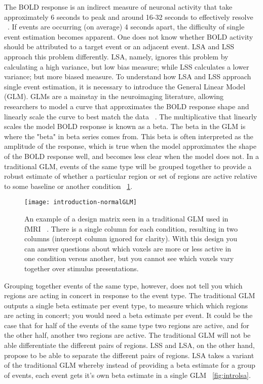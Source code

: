 \documentclass[10pt,letterpaper]{article}
\begin{document}
The BOLD response is an indirect measure of neuronal activity that take approximately 6 seconds to
peak and around 16-32 seconds to effectively resolve ~\cite{Glover1999}.
If events are occurring (on average) 4 seconds apart, the difficulty of single event estimation
becomes apparent.
One does not know whether BOLD activity should be attributed to a target event or an
adjacent event.
LSA and LSS approach this problem differently.
LSA, namely, ignores this problem by calculating a high variance, but low bias measure;
while LSS calculates a lower variance; but more biased measure.
To understand how LSA and LSS approach single event estimation, it is necessary to introduce
the General Linear Model (GLM).
GLMs are a mainstay in the neuroimaging literature, allowing researchers to model
a curve that approximates the BOLD response shape and linearly scale the curve
to best match the data ~\cite{Friston1995}.
The multiplicative that linearly scales the model BOLD response is known as a beta.
The beta in the GLM is where the "beta" in beta series comes from.
This beta is often interpreted as the amplitude of the response, which is true when the
model approximates the shape of the BOLD response well, and becomes less clear when
the model does not.
In a traditional GLM, events of the same type will be grouped together
to provide a robust estimate of whether a particular region or set of regions are
active relative to some baseline or another condition ~\ref{fig:introGLM}.

\begin{figure}[H]
  \centering
  \texttt{[image: introduction-normalGLM]}
  \caption{
    An example of a design matrix seen in a traditional GLM used in fMRI ~\cite{Friston1995}.
    There is a single column for each condition, resulting in two columns (intercept column ignored for clarity).
    With this design you can answer questions about which voxels are more or less active in one condition
    versus another, but you cannot see which voxels vary together over stimulus presentations.
  }
  \label{fig:introGLM}
\end{figure}

Grouping together events of the same type, however, does not tell you which regions are acting in concert
in response to the event type.
The traditional GLM outputs a single beta estimate per event type, to measure which which regions
are acting in concert; you would need a beta estimate per event.
It could be the case that for half of the events of the same type two regions are active,
and for the other half, another two regions are active.
The traditional GLM will not be able differentiate the different pairs of regions.
LSS and LSA, on the other hand, propose to be able to separate the different pairs of regions.
LSA takes a variant of the traditional GLM whereby instead of providing a beta
estimate for a group of events, each event gets it's own beta estimate in a single GLM ~\ref{fig:introlsa}.
\end{document}
